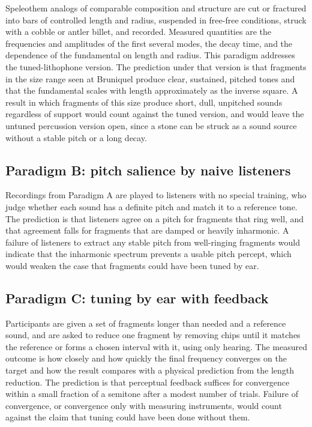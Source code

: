 \documentclass[12pt]{article}
\begin{document}
Speleothem analogs of comparable composition and structure are cut or fractured into bars of controlled length and radius, suspended in free-free conditions, struck with a cobble or antler billet, and recorded. Measured quantities are the frequencies and amplitudes of the first several modes, the decay time, and the dependence of the fundamental on length and radius. This paradigm addresses the tuned-lithophone version. The prediction under that version is that fragments in the size range seen at Bruniquel produce clear, sustained, pitched tones and that the fundamental scales with length approximately as the inverse square. A result in which fragments of this size produce short, dull, unpitched sounds regardless of support would count against the tuned version, and would leave the untuned percussion version open, since a stone can be struck as a sound source without a stable pitch or a long decay.

\subsection*{Paradigm B: pitch salience by naive listeners}

Recordings from Paradigm A are played to listeners with no special training, who judge whether each sound has a definite pitch and match it to a reference tone. The prediction is that listeners agree on a pitch for fragments that ring well, and that agreement falls for fragments that are damped or heavily inharmonic. A failure of listeners to extract any stable pitch from well-ringing fragments would indicate that the inharmonic spectrum prevents a usable pitch percept, which would weaken the case that fragments could have been tuned by ear.

\subsection*{Paradigm C: tuning by ear with feedback}

Participants are given a set of fragments longer than needed and a reference sound, and are asked to reduce one fragment by removing chips until it matches the reference or forms a chosen interval with it, using only hearing. The measured outcome is how closely and how quickly the final frequency converges on the target and how the result compares with a physical prediction from the length reduction. The prediction is that perceptual feedback suffices for convergence within a small fraction of a semitone after a modest number of trials. Failure of convergence, or convergence only with measuring instruments, would count against the claim that tuning could have been done without them.
\end{document}
